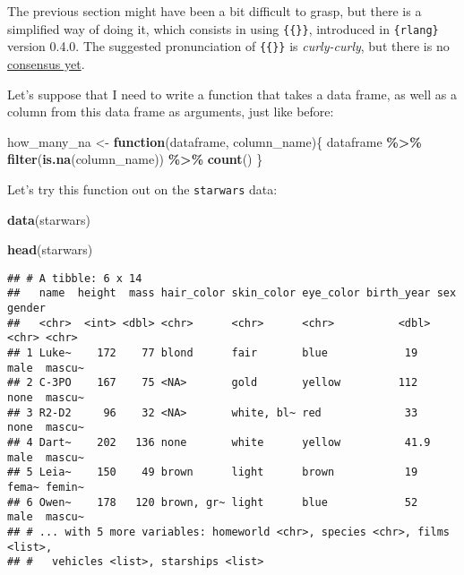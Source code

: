 \documentclass[
]{article}
\newenvironment{Shaded}{\begin{snugshade}}{\end{snugshade}}
\newcommand{\ControlFlowTok}[1]{\textcolor[rgb]{0.13,0.29,0.53}{\textbf{#1}}}
\newcommand{\KeywordTok}[1]{\textcolor[rgb]{0.13,0.29,0.53}{\textbf{#1}}}
\newcommand{\NormalTok}[1]{#1}
\newcommand{\OperatorTok}[1]{\textcolor[rgb]{0.81,0.36,0.00}{\textbf{#1}}}
\newcommand{\StringTok}[1]{\textcolor[rgb]{0.31,0.60,0.02}{#1}}
\begin{document}
The previous section might have been a bit difficult to grasp, but there is a simplified way of doing it,
which consists in using \texttt{\{\{\}\}}, introduced in \texttt{\{rlang\}} version 0.4.0.
The suggested pronunciation of \texttt{\{\{\}\}} is \emph{curly-curly}, but there is no
\href{https://twitter.com/JonTheGeek/status/1144815369766547456}{consensus yet}.

Let's suppose that I need to write a function that takes a data frame, as well as a column from
this data frame as arguments, just like before:

\begin{Shaded}
\begin{Highlighting}[]
\NormalTok{how\_many\_na \textless{}{-}}\StringTok{ }\ControlFlowTok{function}\NormalTok{(dataframe, column\_name)\{}
\NormalTok{  dataframe }\OperatorTok{\%\textgreater{}\%}
\StringTok{    }\KeywordTok{filter}\NormalTok{(}\KeywordTok{is.na}\NormalTok{(column\_name)) }\OperatorTok{\%\textgreater{}\%}
\StringTok{    }\KeywordTok{count}\NormalTok{()}
\NormalTok{\}}
\end{Highlighting}
\end{Shaded}

Let's try this function out on the \texttt{starwars} data:

\begin{Shaded}
\begin{Highlighting}[]
\KeywordTok{data}\NormalTok{(starwars)}

\KeywordTok{head}\NormalTok{(starwars)}
\end{Highlighting}
\end{Shaded}

\begin{verbatim}
## # A tibble: 6 x 14
##   name  height  mass hair_color skin_color eye_color birth_year sex   gender
##   <chr>  <int> <dbl> <chr>      <chr>      <chr>          <dbl> <chr> <chr> 
## 1 Luke~    172    77 blond      fair       blue            19   male  mascu~
## 2 C-3PO    167    75 <NA>       gold       yellow         112   none  mascu~
## 3 R2-D2     96    32 <NA>       white, bl~ red             33   none  mascu~
## 4 Dart~    202   136 none       white      yellow          41.9 male  mascu~
## 5 Leia~    150    49 brown      light      brown           19   fema~ femin~
## 6 Owen~    178   120 brown, gr~ light      blue            52   male  mascu~
## # ... with 5 more variables: homeworld <chr>, species <chr>, films <list>,
## #   vehicles <list>, starships <list>
\end{verbatim}
\end{document}

